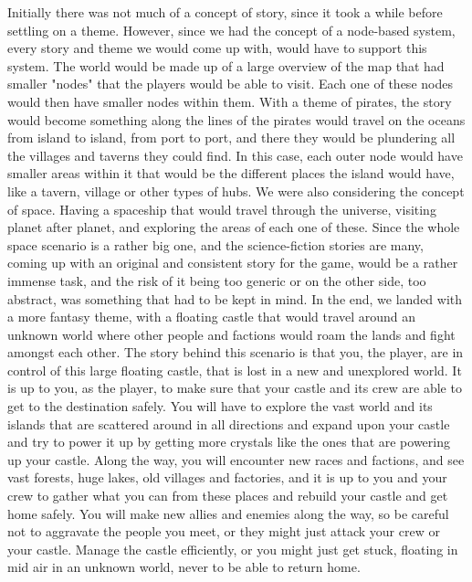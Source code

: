 Initially there was not much of a concept of story, since it took a while before settling on a theme. 
However, since we had the concept of a node-based system, every story and theme we would come up with,
 would have to support this system. The world would be made up of a large overview of the map that had smaller 
 "nodes" that the players would be able to visit. Each one of these nodes would then have smaller nodes within them.
 With a theme of pirates, the story would become something along the lines of 
the pirates would travel on the oceans from island to island, from port to port, and there they would be plundering all 
the villages and taverns they could find. In this case, each outer node would have smaller areas within it that would be 
the different places the island would have, like a tavern, village or other types of hubs. We were also considering the 
concept of space. Having a spaceship that would travel through the universe, visiting planet after planet, and exploring
 the areas of each one of these. Since the whole space scenario is a rather big one, and the science-fiction stories are many,
 coming up with an original and consistent story for the game, would be a rather immense task, and the risk of it being too
 generic or on the other side, too abstract, was something that had to be kept in mind. In the end, we landed with a more fantasy theme,
 with a floating castle that would travel around an unknown world where other people and factions would roam the lands
 and fight amongst each other. The story behind this scenario is that you, the player, are in control of this large floating
 castle, that is lost in a new and unexplored world. It is up to you, as the player, to make sure that your castle and its crew are able to
 get to the destination safely. You will have to explore the vast world and its islands that are scattered around in all directions
 and expand upon your castle and try to power it up by getting more crystals like the ones that are powering up your castle.
 Along the way, you will encounter new races and factions, and see vast forests, huge lakes, old villages and factories, and 
 it is up to you and your crew to gather what you can from these places and rebuild your castle and get home safely. 
 You will make new allies and enemies along the way, so be careful not to aggravate the people you meet, or they might 
 just attack your crew or your castle. Manage the castle efficiently, or you might just get stuck, floating in mid air in 
 an unknown world, never to be able to return home.

